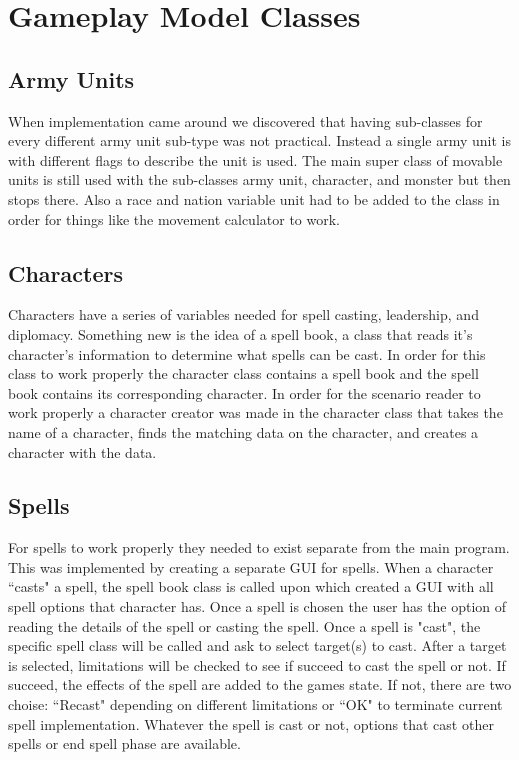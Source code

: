 \documentclass[12pt,a4paper]{article}
\begin{document}
\section{Gameplay Model Classes}
\subsection{Army Units}
When implementation came around we discovered that having sub-classes for every 
different army unit sub-type was not practical. Instead a single army unit is 
with different flags to describe the unit is used. The main super class of 
movable units is still used with the sub-classes army unit, character, and 
monster but then stops there. Also a race and nation variable unit had to be 
added to the class in order for things like the movement calculator to work. 

\subsection{Characters}
Characters have a series of variables needed for spell casting, leadership, and 
diplomacy. Something new is the idea of a spell book, a class that reads it's 
character's information to determine what spells can be cast. In order for this
class to work properly the character class contains a spell book and the spell
book contains its corresponding character. In order for the scenario reader to 
work properly a character creator was made in the character class that takes the
name of a character, finds the matching data on the character, and creates a 
character with the data.

\subsection{Spells}
For spells to work properly they needed to exist separate from the main program.
This was implemented by creating a separate GUI for spells. When a character 
``casts" a spell, the spell book class is called upon which created a GUI with 
all spell options that character has. Once a spell is chosen the user has the 
option of reading the details of the spell or casting the spell. 
\newline
\newline
Once a spell is "cast", the specific spell class will be called and ask to select target(s) to cast. After a target is selected, limitations will be checked to see if succeed to cast the spell or not. If succeed, the effects of the spell are added to the games state. If not, there are two choise: ``Recast" depending on different limitations or ``OK" to terminate current spell implementation. Whatever the spell is cast or not, options that cast other spells or end spell phase are available.
\end{document}
